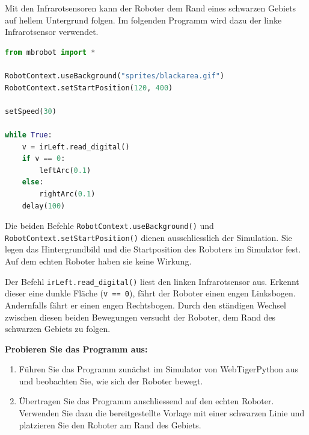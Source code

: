 \begin{myexample}

    Mit den Infrarotsensoren kann der Roboter dem Rand eines schwarzen
    Gebiets auf hellem Untergrund folgen. Im folgenden Programm
    wird dazu der linke Infrarotsensor verwendet.

    \begin{lstlisting}[language=Python]
from mbrobot import *

RobotContext.useBackground("sprites/blackarea.gif")
RobotContext.setStartPosition(120, 400)

setSpeed(30)

while True:
    v = irLeft.read_digital()
    if v == 0:
        leftArc(0.1)
    else:
        rightArc(0.1)
    delay(100)
    \end{lstlisting}

    \begin{sloppypar}
    Die beiden Befehle
    \texttt{RobotContext.useBackground()} und
    \texttt{RobotContext.setStartPosition()} dienen
    ausschliesslich der Simulation. Sie legen das Hintergrundbild
    und die Startposition des Roboters im Simulator fest.
    Auf dem echten Roboter haben sie keine Wirkung.
    \end{sloppypar}

    Der Befehl \texttt{irLeft.read\_digital()} liest den
    linken Infrarotsensor aus. Erkennt dieser eine dunkle
    Fläche (\texttt{v == 0}), fährt der Roboter einen engen
    Linksbogen. Andernfalls fährt er einen engen Rechtsbogen.
    Durch den ständigen Wechsel zwischen diesen beiden
    Bewegungen versucht der Roboter, dem Rand des schwarzen
    Gebiets zu folgen.

    \textbf{Probieren Sie das Programm aus:}
    \begin{enumerate}
        \item Führen Sie das Programm zunächst im Simulator
              von WebTigerPython aus und beobachten Sie,
              wie sich der Roboter bewegt.

        \item Übertragen Sie das Programm anschliessend
              auf den echten Roboter. Verwenden Sie dazu
              die bereitgestellte Vorlage mit einer
              schwarzen Linie und platzieren Sie den
              Roboter am Rand des Gebiets.

    \end{enumerate}
\end{myexample}


